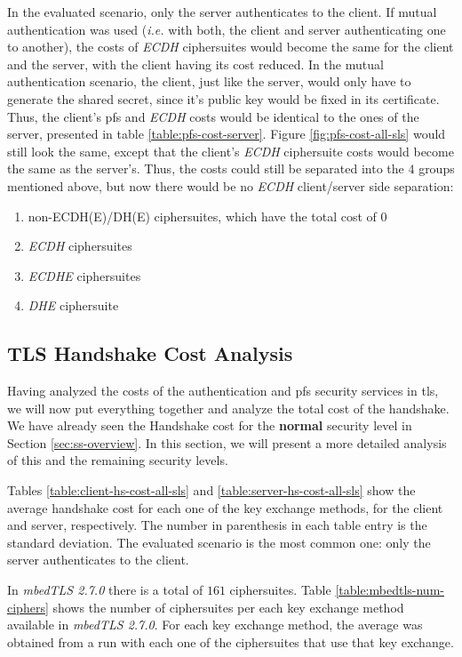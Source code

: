 \documentclass{llncs}
\begin{document}
In the evaluated scenario, only the server authenticates to the client. If mutual authentication was used (\textit{i.e.} with both, the client
and server authenticating one to another), the costs of \textit{ECDH} ciphersuites would become the same for the client and the server, with the client
having its cost reduced. In the mutual authentication scenario, the client, just like the server, would only have to generate the shared secret, since
it's public key would be fixed in its certificate. Thus, the client's \gls{pfs} and \textit{ECDH} costs would be identical to the ones of the server,
presented in table \ref{table:pfs-cost-server}. Figure \ref{fig:pfs-cost-all-sls} would still look the same, except that the client's \textit{ECDH}
ciphersuite costs would become the same as the server's. Thus, the costs could still be separated into the $4$ groups mentioned above,
but now there would be no \textit{ECDH} client/server side separation:

\begin{enumerate}
  \item non-ECDH(E)/DH(E) ciphersuites, which have the total cost of $0$
  \item \textit{ECDH} ciphersuites
  \item \textit{ECDHE} ciphersuites
  \item \textit{DHE} ciphersuite
\end{enumerate}

\subsection{TLS Handshake Cost Analysis} \label{sec:tls-hs-cost}

Having analyzed the costs of the authentication and \gls{pfs} security services in \gls{tls}, we will now put everything together and
analyze the total cost of the handshake. We have already seen the Handshake cost for the \textbf{normal} security level in
Section \ref{sec:ss-overview}. In this section, we will present a more detailed analysis of this and the remaining security levels.

Tables \ref{table:client-hs-cost-all-sls} and \ref{table:server-hs-cost-all-sls} show the average handshake cost for each one of the
key exchange methods, for the client and server, respectively. The number in parenthesis in each table entry is the standard deviation.
The evaluated scenario is the most common one: only the server authenticates to the client.

In \textit{mbedTLS 2.7.0} there is a total of $161$ ciphersuites. Table \ref{table:mbedtls-num-ciphers} shows the number of
ciphersuites per each key exchange method available in \textit{mbedTLS 2.7.0}. For each key exchange method, the average was obtained
from a run with each one of the ciphersuites that use that key exchange.
\end{document}

